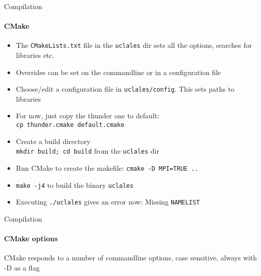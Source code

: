 \documentclass[handout]{beamer}
\def\tblnewline{%
  \global\advance\mylineno by 1
  \ifnum\mylineno=7
    \global\mylineno=0
    \\
    \pagebreak
  \else
    \\
  \fi
}
\newcommand{\code}[1]{{\tt #1}}
\begin{document}
\begin{frame}[allowframebreaks]{Compilation}
\framesubtitle{CMake}
\begin{itemize}
 \item The \code{CMakeLists.txt} file in the \code{uclales} dir sets all the options, searches for libraries etc.
 \item Overrides can be set on the commandline or in a configuration file
 \item Choose/edit a configuration file in \code{uclales/config}. This sets paths to libraries 
 \item For now, just copy the thunder one to default: \\ \code{cp thunder.cmake default.cmake}
 \item Create a build directory \\ \code{mkdir build; cd build} from the \code{uclales} dir
 \item Run CMake to create the makefile: \code{cmake -D MPI=TRUE ..}
 \item \code{make -j4} to build the binary \code{uclales}
 \item Executing \code{./uclales} gives an error now: Missing \code{NAMELIST}
\end{itemize}
\end{frame}

\begin{frame}[<+->]{Compilation}
\framesubtitle{CMake options}
CMake responds to a number of commandline options, case sensitive, always with -D as a flag
\end{frame}
\end{document}

